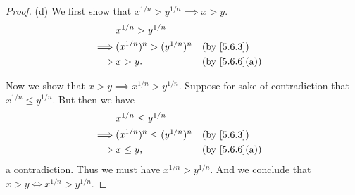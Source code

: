 \begin{proof}{(d)}
  We first show that \(x^{1 / n} > y^{1 / n} \implies x > y\).
  \begin{align*}
             & x^{1 / n} > y^{1 / n}                            \\
    \implies & (x^{1 / n})^n > (y^{1 / n})^n &  & \by{5.6.3}    \\
    \implies & x > y.                        &  & \by{5.6.6}[a]
  \end{align*}

  Now we show that \(x > y \implies x^{1 / n} > y^{1 / n}\).
  Suppose for sake of contradiction that \(x^{1 / n} \leq y^{1 / n}\).
  But then we have
  \begin{align*}
             & x^{1 / n} \leq y^{1 / n}                            \\
    \implies & (x^{1 / n})^n \leq (y^{1 / n})^n &  & \by{5.6.3}    \\
    \implies & x \leq y,                        &  & \by{5.6.6}[a]
  \end{align*}
  a contradiction.
  Thus we must have \(x^{1 / n} > y^{1 / n}\).
  And we conclude that \(x > y \iff x^{1 / n} > y^{1 / n}\).
\end{proof}

